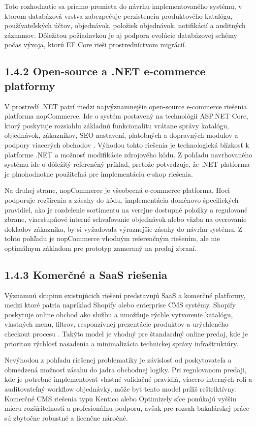 Toto rozhodnutie sa priamo premieta do návrhu implementovaného systému, v ktorom databázová vrstva zabezpečuje perzistenciu produktového katalógu, používateľských účtov, objednávok, položiek objednávok, notifikácií a auditných záznamov. Dôležitou požiadavkou je aj podpora evolúcie databázovej schémy počas vývoja, ktorú EF Core rieši prostredníctvom migrácií.

\subsection*{1.4.2 Open-source a .NET e-commerce platformy}
V prostredí .NET patrí medzi najvýznamnejšie open-source e-commerce riešenia platforma nopCommerce. Ide o systém postavený na technológii ASP.NET Core, ktorý poskytuje rozsiahlu základnú funkcionalitu vrátane správy katalógu, objednávok, zákazníkov, SEO nastavení, platobných a dopravných modulov a podpory viacerých obchodov \cite{nopcommerce_features}. Výhodou tohto riešenia je technologická blízkosť k platforme .NET a možnosť modifikácie zdrojového kódu. Z pohľadu navrhovaného systému ide o dôležitý referenčný príklad, pretože potvrdzuje, že .NET platforma je plnohodnotne použiteľná pre implementáciu e-shop riešenia.

Na druhej strane, nopCommerce je všeobecná e-commerce platforma. Hoci podporuje rozšírenia a zásahy do kódu, implementácia doménovo špecifických pravidiel, ako je rozdelenie sortimentu na verejne dostupné položky a regulované zbrane, viacstupňové interné schvaľovanie objednávok alebo väzba na overovanie dokladov zákazníka, by si vyžadovala výraznejšie zásahy do návrhu systému. Z tohto pohľadu je nopCommerce vhodným referenčným riešením, ale nie optimálnym základom pre prototyp zameraný na predaj zbraní.

\subsection*{1.4.3 Komerčné a SaaS riešenia}
Významnú skupinu existujúcich riešení predstavujú SaaS a komerčné platformy, medzi ktoré patria napríklad Shopify alebo enterprise CMS systémy. Shopify poskytuje online obchod ako službu a umožňuje rýchle vytvorenie katalógu, vlastných menu, filtrov, responzívnej prezentácie produktov a urýchleného checkout procesu \cite{shopify_online_store}. Takýto model je vhodný pre štandardný online predaj, kde je prioritou rýchlosť nasadenia a minimalizácia technickej správy infraštruktúry.

Nevýhodou z pohľadu riešenej problematiky je závislosť od poskytovateľa a obmedzená možnosť zásahu do jadra obchodnej logiky. Pri regulovanom predaji, kde je potrebné implementovať vlastné validačné pravidlá, viacero interných rolí a auditovateľný workflow objednávky, môže byť tento model príliš reštriktívny. Komerčné CMS riešenia typu Kentico alebo Optimizely síce ponúkajú vyššiu mieru rozšíriteľnosti a profesionálnu podporu, avšak pre rozsah bakalárskej práce sú zbytočne robustné a licenčne náročné.

